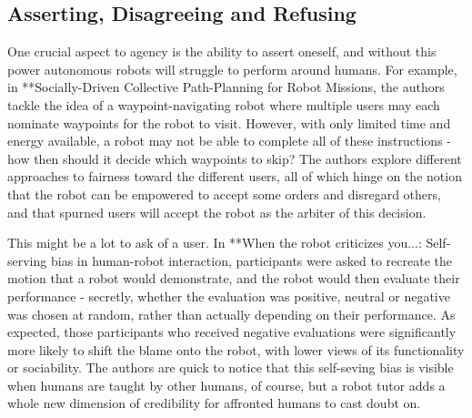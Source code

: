 \documentclass{sfuthesis}
\begin{document}






\subsection{Asserting, Disagreeing and Refusing}

One crucial aspect to agency is the ability to assert oneself, and without this power autonomous robots will struggle to perform around humans. For example, in **Socially-Driven Collective Path-Planning for Robot Missions, the authors tackle the idea of a waypoint-navigating robot where multiple users may each nominate waypoints for the robot to visit. However, with only limited time and energy available, a robot may not be able to complete all of these instructions - how then should it decide which waypoints to skip? The authors explore different approaches to fairness toward the different users, all of which hinge on the notion that the robot can be empowered to accept some orders and disregard others, and that spurned users will accept the robot as the arbiter of this decision. 

This might be a lot to ask of a user. In **When the robot criticizes you...: Self-serving bias in human-robot interaction, participants were asked to recreate the motion that a robot would demonstrate, and the robot would then evaluate their performance - secretly, whether the evaluation was positive, neutral or negative was chosen at random, rather than actually depending on their performance. As expected, those participants who received negative evaluations were significantly more likely to shift the blame onto the robot, with lower views of its functionality or sociability. The authors are quick to notice that this self-seving bias is visible when humans are taught by other humans, of course, but a robot tutor adds a whole new dimension of credibility for affronted humans to cast doubt on.
\end{document}
